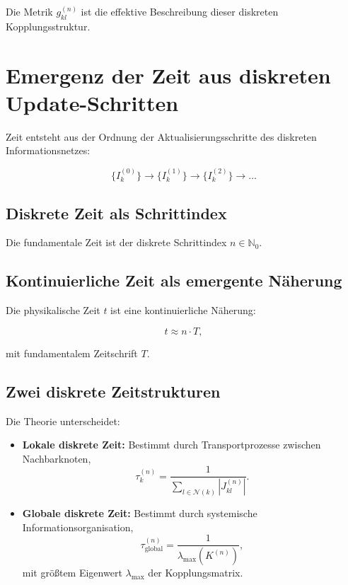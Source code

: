 Die Metrik \( g_{kl}^{(n)} \) ist die effektive Beschreibung dieser diskreten Kopplungsstruktur.

\section{Emergenz der Zeit aus diskreten Update-Schritten}
\label{sec:zeitemergenz}

Zeit entsteht aus der Ordnung der Aktualisierungsschritte des diskreten Informationsnetzes:

\[
\{I_k^{(0)}\} \to \{I_k^{(1)}\} \to \{I_k^{(2)}\} \to \dots
\]

\subsection{Diskrete Zeit als Schrittindex}
\label{sub:diskrete_zeit_schrittindex}

Die fundamentale Zeit ist der diskrete Schrittindex \( n \in \mathbb{N}_0 \).

\subsection{Kontinuierliche Zeit als emergente Näherung}
\label{sub:kontinuierliche_zeit}

Die physikalische Zeit \( t \) ist eine kontinuierliche Näherung:

\[
t \approx n \cdot T,
\]

mit fundamentalem Zeitschrift \( T \).

\subsection{Zwei diskrete Zeitstrukturen}
\label{sub:zwei_zeitstrukturen}

Die Theorie unterscheidet:

\begin{itemize}
    \item \textbf{Lokale diskrete Zeit:} Bestimmt durch Transportprozesse zwischen Nachbarknoten,
    \[
    \tau_k^{(n)} = \frac{1}{\sum_{l \in \mathcal{N}(k)} |J_{kl}^{(n)}|}.
    \]
    \item \textbf{Globale diskrete Zeit:} Bestimmt durch systemische Informationsorganisation,
    \[
    \tau_{\text{global}}^{(n)} = \frac{1}{\lambda_{\text{max}}(K^{(n)})},
    \]
    mit größtem Eigenwert \( \lambda_{\text{max}} \) der Kopplungsmatrix.
\end{itemize}

